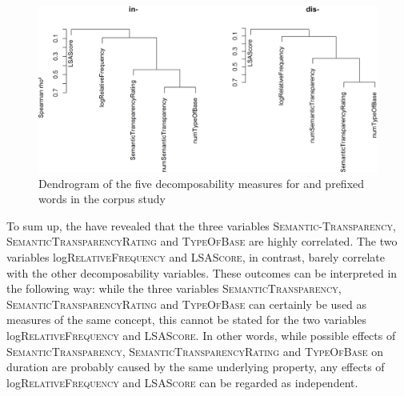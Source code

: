 \begin{figure}  
	
	\includegraphics[scale=0.5]{images/Corpus/clusterAnalysisDecomposabilityCorpusDisAndIn.png}
	\caption{Dendrogram of the five decomposability measures for  and prefixed words in the corpus study}
	\label{fig:cluster corpus dis and in}
\end{figure}



To sum up, the  have revealed that the three variables \textsc{Seman\-tic-Transparency}, \textsc{SemanticTransparencyRating} and \textsc{TypeOfBase} are high\-ly correlated. The two variables log\textsc{RelativeFrequency} and \textsc{LSAScore}, in contrast, barely correlate with the other decomposability variables.
These outcomes can be interpreted in the following way: while the three variables  \textsc{SemanticTransparency}, \textsc{SemanticTransparencyRating} and \textsc{TypeOfBase} can certainly be used as measures of the same concept, this cannot be stated for the two variables log\textsc{RelativeFrequency} and \textsc{LSAScore}. In other words,  while possible effects of \textsc{SemanticTransparency}, \textsc{SemanticTransparencyRating} and \textsc{TypeOfBase} on duration are probably caused by the same underlying property, any effects of log\textsc{RelativeFrequency} and \textsc{LSAScore} can be regarded as independent.


